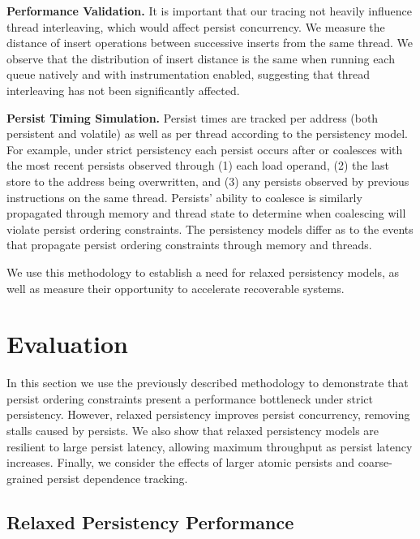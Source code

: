 \textbf{Performance Validation.}
It is important that our tracing not heavily influence thread interleaving, which would affect persist concurrency.
We measure the distance of insert operations between successive inserts from the same thread.
We observe that the distribution of insert distance is the same when running each queue natively and with instrumentation enabled, suggesting that thread interleaving has not been significantly affected.

\textbf{Persist Timing Simulation.}
Persist times are tracked per address (both persistent and volatile) as well as per thread according to the persistency model.
For example, under strict persistency each persist occurs after or coalesces with the most recent persists observed through (1) each load operand, (2) the last store to the address being overwritten, and (3) any persists observed by previous instructions on the same thread.
Persists' ability to coalesce is similarly propagated through memory and thread state to determine when coalescing will violate persist ordering constraints.
The persistency models differ as to the events that propagate persist ordering constraints through memory and threads.

We use this methodology to establish a need for relaxed persistency models, as well as measure their opportunity to accelerate recoverable systems.

\section{Evaluation}
\label{sec:PersistencyEval:Evaluation}

In this section we use the previously described methodology to demonstrate that persist ordering constraints present a performance bottleneck under strict persistency.
However, relaxed persistency improves persist concurrency, removing stalls caused by persists.
We also show that relaxed persistency models are resilient to large persist latency, allowing maximum throughput as persist latency increases.
Finally, we consider the effects of larger atomic persists and coarse-grained persist dependence tracking. 

\subsection{Relaxed Persistency Performance}
\label{section:Evaluation:PersistencyPerformance}

